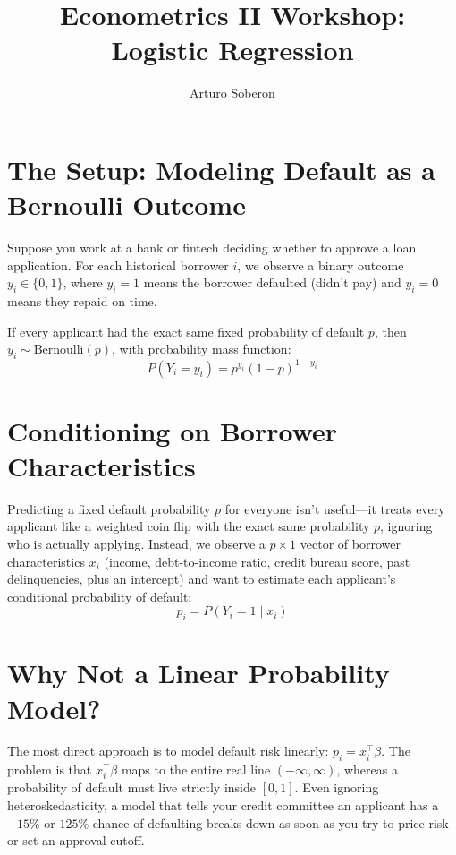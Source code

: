 \documentclass[12pt]{article}
\begin{document}
\title{Econometrics II Workshop: Logistic Regression}
\author{Arturo Soberon}
\date{}
\maketitle

\setcounter{section}{0}

\section{The Setup: Modeling Default as a Bernoulli Outcome}

Suppose you work at a bank or fintech deciding whether to approve a loan
application. For each historical borrower $i$, we observe a binary outcome
$y_i \in \{0, 1\}$, where $y_i = 1$ means the borrower defaulted (didn't pay)
and $y_i = 0$ means they repaid on time.

If every applicant had the exact same fixed probability of default $p$, then
$y_i \sim \text{Bernoulli}(p)$, with probability mass function:
\begin{equation}
    P(Y_i = y_i) = p^{y_i}(1 - p)^{1 - y_i}
\end{equation}

\section{Conditioning on Borrower Characteristics}

Predicting a fixed default probability $p$ for everyone isn't useful---it
treats every applicant like a weighted coin flip with the exact same
probability $p$, ignoring who is actually applying. Instead, we observe a
$p \times 1$ vector of borrower characteristics $x_i$ (income, debt-to-income
ratio, credit bureau score, past delinquencies, plus an intercept) and want to
estimate each applicant's conditional probability of default:
\begin{equation}
    p_i = P(Y_i = 1 \mid x_i)
\end{equation}

\section{Why Not a Linear Probability Model?}

The most direct approach is to model default risk linearly: $p_i = x_i^\top \beta$.
The problem is that $x_i^\top \beta$ maps to the entire real line
$(-\infty, \infty)$, whereas a probability of default must live strictly inside
$[0, 1]$. Even ignoring heteroskedasticity, a model that tells your credit
committee an applicant has a $-15\%$ or $125\%$ chance of defaulting breaks
down as soon as you try to price risk or set an approval cutoff.
\end{document}
